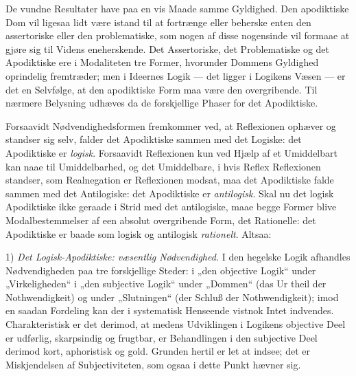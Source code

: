 \documentclass[12pt]{book}
\newcommand{\opage}[1]{\marginnote{\footnotesize\textit{[#1]}}}
\begin{document}
De vundne Resultater have paa en vis Maade samme
Gyldighed. Den apodiktiske Dom vil ligesaa lidt være istand
til at fortrænge eller beherske enten den assertoriske
eller den problematiske, som nogen af disse nogensinde
vil formaae at gjøre sig til Videns eneherskende. Det
Assertoriske, det Problematiske og det Apodiktiske ere i Modaliteten
tre Former, hvorunder Dommens Gyldighed oprindelig
fremtræder; men i Ideernes Logik --- det ligger i
Logikens Væsen --- er det en Selvfølge, at den apodiktiske
Form maa være den overgribende. Til nærmere Belysning
udhæves da de forskjellige Phaser for det Apodiktiske.

Forsaavidt Nødvendighedsformen fremkommer ved, at Reflexionen
ophæver og standser sig selv, falder det Apodiktiske
sammen med det Logiske: det Apodiktiske er \emph{logisk}. Forsaavidt
Reflexionen kun ved Hjælp af et Umiddelbart kan naae til
Umiddelbarhed, og det Umiddelbare, i hvis Reflex Reflexionen
standser, som Realnegation er Reflexionen modsat, maa det
Apodiktiske falde sammen med det Antilogiske: det Apodiktiske
er \emph{antilogisk}. Skal nu det logisk Apodiktiske ikke geraade i
Strid med det antilogiske, maae begge Former blive Modalbestemmelser
af een absolut overgribende Form, det Rationelle:
det Apodiktiske er baade som logisk og antilogisk \emph{rationelt}.
Altsaa:

1) \emph{Det Logisk-Apodiktiske: væsentlig Nødvendighed.}
I den hegelske Logik afhandles Nødvendigheden paa
tre forskjellige Steder: i „den objective Logik“ under „Virkeligheden“
i „den subjective Logik“ under „Dommen“ (das Ur%
\opage{254}theil der Nothwendigkeit) og under „Slutningen“ (der Schluß der
Nothwendigkeit); imod en saadan Fordeling kan der i systematisk
Henseende vistnok Intet indvendes. Charakteristisk er
det derimod, at medens Udviklingen i Logikens objective Deel
er udførlig, skarpsindig og frugtbar, er Behandlingen i den
subjective Deel derimod kort, aphoristisk og gold. Grunden
hertil er let at indsee; det er Miskjendelsen af Subjectiviteten,
som ogsaa i dette Punkt hævner sig.
\end{document}
